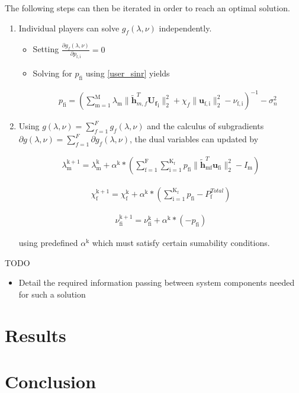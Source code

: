 \documentclass[12pt,a4paper]{report}
\begin{document}
The following steps can then be iterated in order to reach an optimal solution. 
\begin{enumerate}
\item 
Individual players can solve $ g_f(\lambda,\nu) $ independently.
\begin{itemize}
\item Setting $\frac{\partial g_f(\lambda,\nu)}{\partial p_{\mathrm{f,i}}} = 0$ 

\item 
Solving for $p_{\mathrm{fi}}$ using \eqref{user_sinr} yields

\begin{gather}
p_{\mathrm{fi}} = (\sum_{\mathrm{m=1}}^{\mathrm{M}}\lambda_{\mathrm{m}}\|\mathbf{\tilde{h}}_{m,f}^T \mathbf{U_f}_{\mathrm{i}}\|^2_2
+\chi_{f} \|\mathbf{u}_{\mathrm{f,i}}\|^2_2
-\nu_{\mathrm{f,i}}
 )^{-1}
  - \sigma^2_n
\end{gather}

\end{itemize}
\item 
Using $g(\lambda,\nu) = \sum_{f=1}^{F}g_f(\lambda,\nu)$ and the calculus of subgradients $\partial g(\lambda,\nu) = \sum_{f=1}^{F} \partial g_f(\lambda,\nu)$, the dual variables can updated by 

\begin{gather}
\lambda_{\mathrm{m}}^{\mathrm{k+1}} = 
\lambda_{\mathrm{m}}^{\mathrm{k}}
+
\alpha^{\mathrm{k}}*
(
\sum _{\mathrm{f=1}}^{\mathrm{F}}
\sum _{\mathrm{i=1}}^{\mathrm{K_{\mathrm{f}}}}
p_{\mathrm{fi}}
\|\mathbf{\tilde{h}}_{\mathrm{mf}}^T \mathbf{u_{\mathrm{fi}}}\|^2_2 
- I_{\mathrm{m}}
)
\end{gather}


\begin{gather}
\chi_{\mathrm{f}}^{\mathrm{k+1}} = 
\chi_{\mathrm{f}}^{\mathrm{k}}
+
\alpha^{\mathrm{k}}*
(\sum_{\mathrm{i=1}}^{\mathrm{K_{\mathrm{f}}}} p_{\mathrm{fi}} - P_{\mathrm{f}}^{Total}) 
\end{gather}

\begin{gather}
\nu_{\mathrm{fi}}^{\mathrm{k+1}} = 
\nu_{\mathrm{fi}}^{\mathrm{k}}
+
\alpha^{\mathrm{k}}*
(-p_{\mathrm{fi}})
\end{gather}

using predefined $\alpha^{\mathrm{k}}$ which must satisfy certain sumability conditions.



\end{enumerate} 

TODO 
\begin{itemize}
\item Detail the required information passing between system components needed for such a solution
\end{itemize}

\chapter{Results}

\chapter{Conclusion}

\newpage

\end{document}
